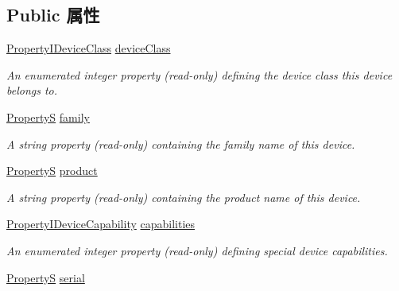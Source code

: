 \subsection*{Public 属性}
\begin{DoxyCompactItemize}
\item 
\hyperlink{group___common_interface_gaa711dff24b159d7f25686f736db21a2f}{Property\+I\+Device\+Class} \hyperlink{classmv_i_m_p_a_c_t_1_1acquire_1_1_device_a3cc7db9051fa3ebe73a8f38a274dad19}{device\+Class}
\begin{DoxyCompactList}\small\item\em An enumerated integer property {\bfseries }(read-\/only) defining the device class this device belongs to. \end{DoxyCompactList}\item 
\hypertarget{classmv_i_m_p_a_c_t_1_1acquire_1_1_device_abaf3edcac50921a93df9080c39c75fc3}{\hyperlink{classmv_i_m_p_a_c_t_1_1acquire_1_1_property_s}{Property\+S} \hyperlink{classmv_i_m_p_a_c_t_1_1acquire_1_1_device_abaf3edcac50921a93df9080c39c75fc3}{family}}\label{classmv_i_m_p_a_c_t_1_1acquire_1_1_device_abaf3edcac50921a93df9080c39c75fc3}

\begin{DoxyCompactList}\small\item\em A string property {\bfseries }(read-\/only) containing the family name of this device. \end{DoxyCompactList}\item 
\hypertarget{classmv_i_m_p_a_c_t_1_1acquire_1_1_device_af37787e344732926a99103df8faf05be}{\hyperlink{classmv_i_m_p_a_c_t_1_1acquire_1_1_property_s}{Property\+S} \hyperlink{classmv_i_m_p_a_c_t_1_1acquire_1_1_device_af37787e344732926a99103df8faf05be}{product}}\label{classmv_i_m_p_a_c_t_1_1acquire_1_1_device_af37787e344732926a99103df8faf05be}

\begin{DoxyCompactList}\small\item\em A string property {\bfseries }(read-\/only) containing the product name of this device. \end{DoxyCompactList}\item 
\hyperlink{group___common_interface_ga4a143abc5e951b2d4a22a0a835d4c5d1}{Property\+I\+Device\+Capability} \hyperlink{classmv_i_m_p_a_c_t_1_1acquire_1_1_device_ae12276c8f5655fa8d771774804e53c13}{capabilities}
\begin{DoxyCompactList}\small\item\em An enumerated integer property {\bfseries }(read-\/only) defining special device capabilities. \end{DoxyCompactList}\item 
\hypertarget{classmv_i_m_p_a_c_t_1_1acquire_1_1_device_a7d4f0c0118d979c503abeb37f65b0c8b}{\hyperlink{classmv_i_m_p_a_c_t_1_1acquire_1_1_property_s}{Property\+S} \hyperlink{classmv_i_m_p_a_c_t_1_1acquire_1_1_device_a7d4f0c0118d979c503abeb37f65b0c8b}{serial}}\label{classmv_i_m_p_a_c_t_1_1acquire_1_1_device_a7d4f0c0118d979c503abeb37f65b0c8b}


\end{DoxyCompactItemize}
